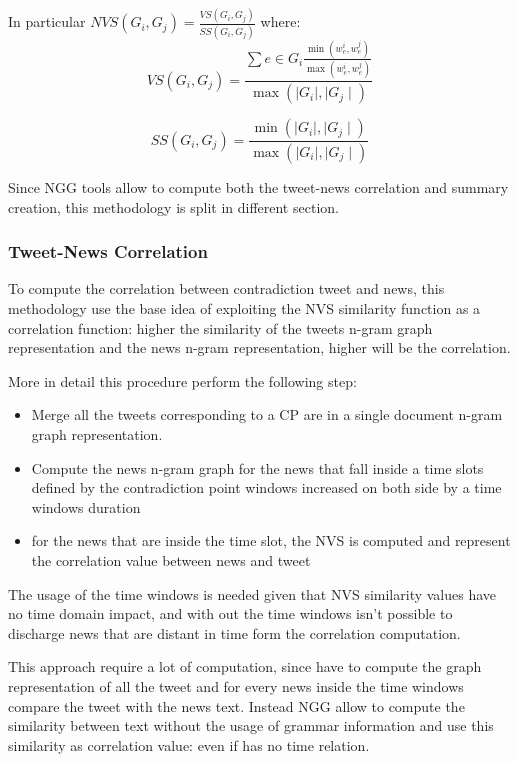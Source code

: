 In particular $NVS(G_i,G_j) = \frac{VS(G_i,G_j)}{SS(G_i,G_j)}$ where:
\begin{equation}
 VS(G_i,G_j)=\frac{\sum e \in G_i \frac{\min(w_e^i, w_e^j)}{\max(w_e^i, w_e^j)}}{\max(\mid G_i \mid, \mid G_j \mid)}
\end{equation}

\begin{equation}
 SS(G_i,G_j)=\frac{\min(\mid G_i \mid, \mid G_j \mid)}{\max(\mid G_i \mid, \mid G_j \mid)}
\end{equation}

Since NGG tools allow to compute both the tweet-news correlation and summary creation, this methodology is split in different section.

\subsubsection*{Tweet-News Correlation}
To compute the correlation between contradiction tweet and news, this methodology use the base idea of exploiting the NVS similarity function as a correlation function: higher the similarity of the tweets n-gram graph representation and the news n-gram representation, higher will be the correlation.

More in detail this procedure perform the following step:
\begin{itemize}
	\item Merge all the tweets corresponding to a CP are in a single document n-gram graph representation.
	\item Compute the news n-gram graph for the news that fall inside a time slots defined by the contradiction point windows increased on both side by a time windows duration
	\item for the news that are inside the time slot, the NVS is computed and represent the correlation value between news and tweet
\end{itemize}

The usage of the time windows is needed given that NVS similarity values have no time domain impact, and with out the time windows isn't possible to  discharge news that are distant in time form the correlation computation.

This approach require a lot of computation, since have to compute the graph representation of all the tweet and for every news inside the time windows compare the tweet with the news text. Instead NGG allow to compute the similarity between text without the usage of grammar information and use this similarity as correlation value: even if has no time relation.


